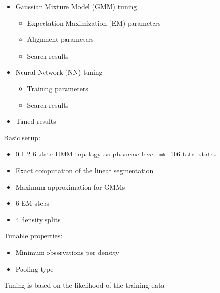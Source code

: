 \documentclass[11pt, a4paper, landscape]{article}
\begin{document}
\TitlePage

\NewPage{}
\vfill
\begin{itemize}
  \item Gaussian Mixture Model (GMM) tuning
  \begin{itemize}
    \item Expectation-Maximization (EM) parameters
    \item Alignment parameters
    \item Search results
  \end{itemize}
  \item Neural Network (NN) tuning
  \begin{itemize}
    \item Training parameters
    \item Search results
  \end{itemize}
  \item Tuned results
\end{itemize}
\vfill

\NewPage{}
\vfill
Basic setup:
\begin{itemize}
  \item 0-1-2 6 state HMM topology on phoneme-level $\Rightarrow$ 106 total states
  \item Exact computation of the linear segmentation
  \item Maximum approximation for GMMs
  \item 6 EM steps
  \item 4 density splits
\end{itemize} 
\vspace{20pt}
Tunable properties:
\begin{itemize}
  \item Minimum observations per density
  \item Pooling type
\end{itemize}
\vspace{20pt}
Tuning is based on the likelihood of the training data
\vfill

 
\end{document}

